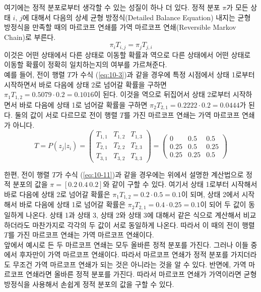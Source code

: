 \documentclass[a4paper]{oblivoir}
\begin{document}
여기에는 정적 분포로부터 생각할 수 있는 성질이 하나 더 있다. 정적 분포 $\pi$가 모든 상태 $i$, $j$에 대해서 다음의 상세 균형 방정식(Detailed Balance Equation) 내지는 균형 방정식을 만족할 때의 마르코프 연쇄를 가역 마르코프 연쇄(Reversible Markov Chain)로 부른다.  
\begin{equation}
\pi_{i} T_{i,j} = \pi_{j} T_{j,i}
\label{eq:10-10}
\end{equation}
이것은 어떤 상태에서 다른 상태로 이동할 확률과 역으로 다른 상태에서 어떤 상태로 이동할 확률이 정확히 일치하는지의 여부를 가르쳐준다. \\

예를 들어, 전이 행렬 $T$가 수식 (\ref{eq:10-3})과 같을 경우에 특정 시점에서 상태 1로부터 시작하면서 바로 다음에 상태 2로 넘어갈 확률을 구하면 $\pi_{1}T_{1,2} = 0.5079 \cdot 0.2 = 0.1016$이 된다. 이것을 역으로 뒤집어서 상태 2로부터 시작하면서 바로 다음에 상태 1로 넘어갈 확률을 구하면 $\pi_{2}T_{2,1} = 0.2222 \cdot 0.2 = 0.0444$가 된다. 둘의 값이 서로 다르므로 전이 행렬 $T$를 가진 마르코프 연쇄는 가역 마르코프 연쇄가 아니다. \\

\begin{equation}
T = P(z_j|z_i) = \left( \begin{array}{ccc} T_{1,1} & T_{1,2} & T_{1,3} \\ T_{2,1} & T_{2,2} & T_{2,3} \\ T_{3,1} & T_{3,2} & T_{3,3} \end{array} \right) = \left( \begin{array}{ccc} 0 & 0.5 & 0.5 \\ 0.25 & 0.5 & 0.25 \\ 0.25 & 0.25 & 0.5 \end{array} \right) 
\label{eq:10-11}
\end{equation} 

한편, 전이 행렬 $T$가 수식 (\ref{eq:10-11})과 같을 경우에는 위에서 설명한 계산법으로 정적 분포의 값을 $\pi = [0.2 \ 0.4 \ 0.2]$와 같이 구할 수 있다. 여기서 상태 1로부터 시작해서 바로 다음에 상태 2로 넘어갈 확률은 $\pi_{1}T_{1,2} = 0.2 \cdot 0.5 = 0.1$이 되며, 상태 2에서 시작해서 바로 다음에 상태 1로 넘어갈 확률은 $\pi_{2}T_{2,1} = 0.4 \cdot 0.25 = 0.1$이 되어 두 값이 동일하게 나온다. 상태 1과 상태 3, 상태 2와 상태 3에 대해서 같은 식으로 계산해서 비교하더라도 마찬가지로 각각의 두 값이 서로 동일하게 나온다. 따라서 이 때의 전이 행렬 $T$를 가진 마르코프 연쇄는 가역 마르코프 연쇄이다. \\

앞에서 예시로 든 두 마르코프 연쇄는 모두 올바른 정적 분포를 가진다. 그러나 이들 중에서 후자만이 가역 마르코프 연쇄이다. 따라서 마르코프 연쇄가 정적 분포를 가지더라도 무조건 가역 마르코프 연쇄가 되는 것은 아니라는 것을 알 수 있다. 반면에, 가역 마르코프 연쇄라면 올바른 정적 분포를 가진다. 따라서 마르코프 연쇄가 가역이라면 균형 방정식을 사용해서 손쉽게 정적 분포의 값을 구할 수 있다. \\
\end{document}
